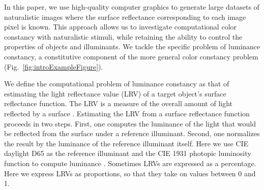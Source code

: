 \documentclass{jov}
\begin{document}
In this paper, we use high-quality computer graphics to generate large datasets of naturalistic images where the surface reflectance corresponding to each image pixel is known. 
This approach allows us to investigate computational color constancy with naturalistic stimuli, while retaining the ability to control the properties of objects and illuminants. We tackle the specific problem of luminance constancy, a constitutive component of the more general color constancy problem (Fig.~\ref{fig:introExampleFigure}). 

We define the computational problem of luminance constancy as that of estimating the light reflectance value (LRV) of a target object's surface reflectance function.
The LRV is a measure of the overall amount of light reflected by a surface \cite{astm1121477}.
Estimating the LRV from a surface reflectance function proceeds in two steps.
First, one computes the luminance of the light that would be reflected from the surface under a reference illuminant.
Second, one normalizes the result by the luminance of the reference illuminant itself.
Here we use CIE daylight D65 as the reference illuminant and the CIE 1931 photopic luminosity function to compute luminance \cite{CIE86}.
Sometimes LRVs are expressed as a percentage.
Here we express LRVs as proportions, so that they take on values between 0 and 1.
\end{document}
